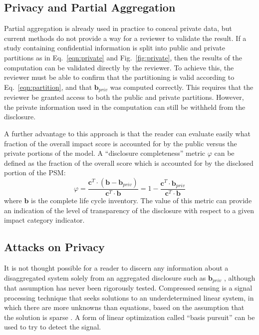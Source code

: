 \subsection{Privacy and Partial Aggregation} 

Partial aggregation is already used in practice to conceal private data, but current methods do not provide a way for a reviewer to validate the result.  If a study containing confidential information is split into public and private partitions as in Eq.~\ref{eqn:private} and Fig.~\ref{fig:private}, then the results of the computation can be validated directly by the reviewer.  To achieve this, the reviewer must be able to confirm that the partitioning is valid according to Eq.~\ref{eqn:partition}, and that $\mathbf{b}_{priv}$ was computed correctly.  This requires that the reviewer be granted access to both the public and private partitions.  However, the private information used in the computation can still be withheld from the disclosure.

A further advantage to this approach is that the reader can evaluate easily what fraction of the overall impact score is accounted for by the public versus the private portions of the model.  A ``disclosure completeness'' metric $\varphi$ can be defined as the fraction of the overall score which is accounted for by the disclosed portion of the PSM:
\begin{equation}
  \varphi =  \frac{\mathbf{c}^T\cdot(\mathbf{b} - \mathbf{b}_{priv})}{\mathbf{c}^T\cdot\mathbf{b}} = 1 - \frac{\mathbf{c}^T\cdot\mathbf{b}_{priv}}{\mathbf{c}^T\cdot\mathbf{b}}
  \label{eqn:metric}
\end{equation}
where $\mathbf{b}$ is the complete life cycle inventory.  The value of this metric can provide an indication of the level of transparency of the disclosure with respect to a given impact category indicator.  

\subsection{Attacks on Privacy}

It is not thought possible for a reader to discern any information about a disaggregated system solely from an aggregated disclosure such as $\mathbf{b}_{priv}$ \citep[Ch. 3]{UNEP_2011}, although that assumption has never been rigorously tested.  Compressed sensing is a signal processing technique that seeks solutions to an underdetermined linear system, in which there are more unknowns than equations, based on the assumption that the solution is sparse \citep{Donoho_2006}.  A form of linear optimization called ``basis pursuit'' can be used to try to detect the signal.

